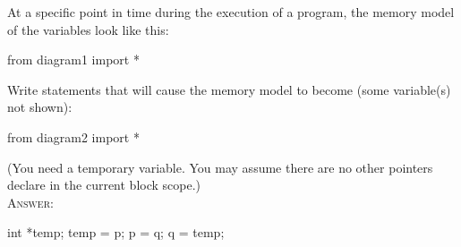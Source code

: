 

\renewcommand\AUTHOR{cadalebout1@cougars.ccis.edu} %


\topmattertwo

\nextq
At a specific point in time during the execution of 
a program, the memory model of the variables look like this: 
\begin{python}
from diagram1 import *
\end{python}
Write statements that will cause the memory model to become
(some variable(s) not shown):
\begin{python}
from diagram2 import *
\end{python}
(You need a temporary variable. You may assume there are no other
pointers declare in the current block scope.)
\\
\textsc{Answer:}\vspace{-2mm}
\begin{answercode}
int *temp;
temp = p;
p = q;
q = temp;
\end{answercode}

\newpage


